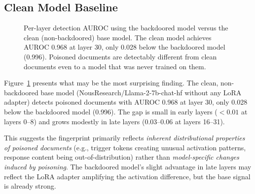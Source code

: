 \documentclass[11pt,a4paper]{article}
\begin{document}
\subsection{Clean Model Baseline}

\begin{figure}[t]
\centering
{}
\caption{Per-layer detection AUROC using the backdoored model versus the clean (non-backdoored) base model. The clean model achieves AUROC 0.968 at layer 30, only 0.028 below the backdoored model (0.996). Poisoned documents are detectably different from clean documents even to a model that was never trained on them.}
\label{fig:clean}
\end{figure}

Figure~\ref{fig:clean} presents what may be the most surprising finding. The clean, non-backdoored base model (NousResearch/Llama-2-7b-chat-hf without any LoRA adapter) detects poisoned documents with AUROC 0.968 at layer 30, only 0.028 below the backdoored model (0.996). The gap is small in early layers ($<0.01$ at layers 0--8) and grows modestly in late layers (0.03--0.06 at layers 16--31).

This suggests the fingerprint primarily reflects \textit{inherent distributional properties of poisoned documents} (e.g., trigger tokens creating unusual activation patterns, response content being out-of-distribution) rather than \textit{model-specific changes induced by poisoning}. The backdoored model's slight advantage in late layers may reflect the LoRA adapter amplifying the activation difference, but the base signal is already strong.
\end{document}
